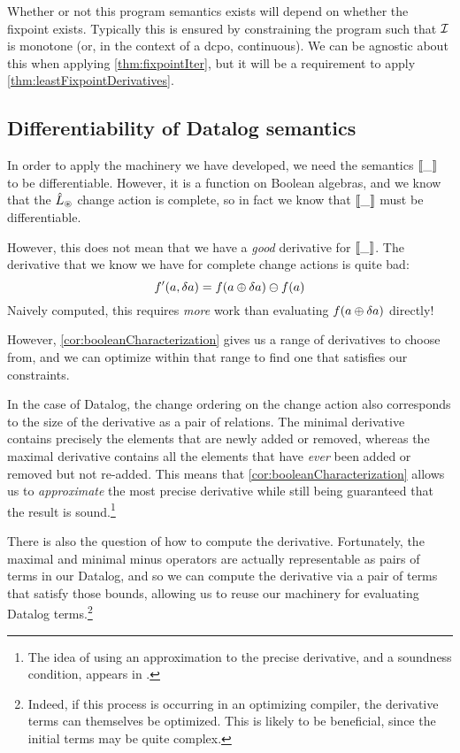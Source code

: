 Whether or not this program semantics exists will depend on whether the fixpoint
exists. Typically this is ensured by constraining the program such that $\mathcal{I}$
is monotone (or, in the context of a dcpo, continuous). We can be agnostic
about this when applying \cref{thm:fixpointIter}, but it will be a requirement to
apply \cref{thm:leastFixpointDerivatives}.

\subsection{Differentiability of Datalog semantics}
\label{sec:datalogDifferentiability}

In order to apply the machinery we have developed, we need the semantics $\llbracket \_ \rrbracket$ to
be differentiable. However, it is a function on Boolean algebras, and we know
that the $\hat{L}_\circledast$ change action is complete, so in fact we know that
$\llbracket \_ \rrbracket$ must be differentiable.

However, this does not mean that we have a \emph{good} derivative for
$\llbracket \_ \rrbracket$. The derivative that we know we have for complete change actions
is quite bad:
\begin{displaymath}
  f'(a, \delta a) = f(a \oplus \delta a) \ominus f(a)
\end{displaymath}
Naively computed, this requires \emph{more} work than evaluating $f(a \oplus \delta a)$ directly!

However, \cref{cor:booleanCharacterization} gives us a range of derivatives to
choose from, and we can optimize within that range to find one that satisfies
our constraints.

In the case of Datalog, the change ordering on the change action also
corresponds to the size of the derivative as a pair of relations. The minimal
derivative contains precisely the elements that are newly added or removed,
whereas the maximal derivative contains all the elements that have \emph{ever}
been added or removed but not re-added. This means that \cref{cor:booleanCharacterization} allows
us to \emph{approximate} the most precise derivative while still being
guaranteed that the result is sound.\footnote{The idea of using an approximation
to the precise derivative, and a soundness condition, appears in \textcite{bancilhon1986amateur}.}

There is also the question of how to compute the derivative. Fortunately, the
maximal and minimal minus operators are actually representable as pairs of terms
in our Datalog, and so we can compute the derivative via a pair of terms that
satisfy those bounds, allowing us to reuse our machinery for evaluating Datalog
terms.\footnote{Indeed, if this process is occurring in an optimizing compiler,
  the derivative terms can themselves be optimized. This is likely to be
  beneficial, since the initial terms may be quite complex.}

